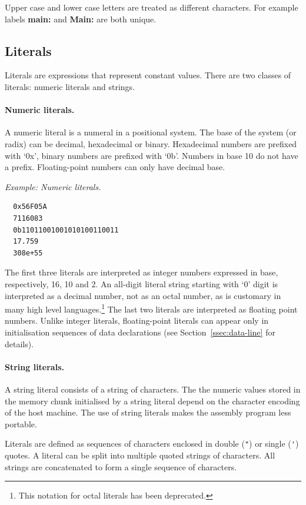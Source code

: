 \documentclass[twoside]{tceusermanual}
\begin{document}
Upper case and lower case letters are treated as different characters.
For example labels \textbf{main:} and \textbf{Main:} are both unique.

\subsection{Literals}
\label{ssec:literals}

Literals are expressions that represent constant values. There are two
classes of literals: numeric literals and strings.

\paragraph{Numeric literals.}

A numeric literal is a numeral in a positional system. The base of the
system (or radix) can be decimal, hexadecimal or binary. Hexadecimal numbers
are prefixed with `0x', binary numbers are prefixed with `0b'. Numbers in
base 10 do not have a prefix. Floating-point numbers can only have decimal
base.

\emph{Example: Numeric literals.}
%
\begin{verbatim}
  0x56F05A
  7116083
  0b11011001001010100110011
  17.759
  308e+55
\end{verbatim}
The first three literals are interpreted as integer numbers expressed in
base, respectively, 16, 10 and 2. An all-digit literal string starting with
`0' digit is interpreted as a decimal number, not as an octal number, as is
customary in many high level languages.\footnote{
%
  This notation for octal literals has been deprecated.}
%
The last two literals are interpreted as floating point numbers. Unlike
integer literals, floating-point literals can appear only in initialisation
sequences of data declarations (see Section~\ref{ssec:data-line} for
details).

\paragraph{String literals.}

A string literal consists of a string of characters. The the numeric values
stored in the memory chunk initialised by a string literal depend on the
character encoding of the host machine.
%
%
The use of string literals makes the assembly program less portable.

Literals are defined as sequences of characters enclosed in double
(\verb|"|) or single (\verb|'|) quotes. A literal can be split into multiple
quoted strings of characters. All strings are concatenated to form a single
sequence of characters.
\end{document}
